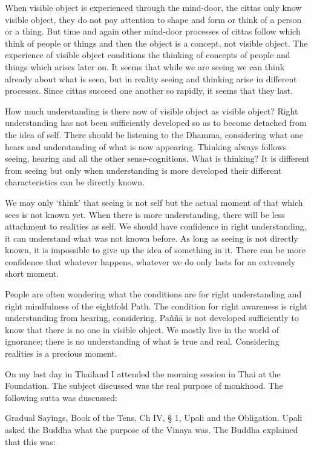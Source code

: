 When visible object is experienced through the mind-door, the cittas only know 
visible object, they do not pay attention to shape and form or think of a person 
or a thing. But time and again other mind-door processes of cittas follow which 
think of people or things and then the object is a concept, not visible object. The 
experience of visible object conditions the thinking of concepts of people and 
things which arises later on. It seems that while we are seeing we can think already about what is seen, but in reality seeing and thinking arise in different 
processes. Since cittas succeed one another so rapidly, it seems that they last. 

How much understanding is there now of visible object as visible object? Right 
understanding has not been sufficiently developed so as to become detached 
from the idea of self. There should be listening to the Dhamma, considering 
what one hears and understanding of what is now appearing. Thinking always 
follows seeing, hearing and all the other sense-cognitions. What is thinking? It 
is different from seeing but only when understanding is more developed their 
different characteristics can be directly known. 

We may only `think' that seeing is not self but the actual moment of that which 
sees is not known yet. When there is more understanding, there will be less attachment to realities as self. We should have confidence in right understanding, 
it can understand what was not known before. As long as seeing is not directly 
known, it is impossible to give up the idea of something in it. There can be 
more confidence that whatever happens, whatever we do only lasts for an extremely short moment. 

People are often wondering what the conditions are for right understanding and 
right mindfulness of the eightfold Path. The condition for right awareness is 
right understanding from hearing, considering. Paññā is not developed sufficiently to know that there is no one in visible object. We mostly live in the 
world of ignorance; there is no understanding of what is true and real. Considering realities is a precious moment. 

On my last day in Thailand I attended the morning session in Thai at the Foundation. The subject discussed was the real purpose of monkhood. The following sutta was duscussed: 

Gradual Sayings, Book of the Tens, Ch IV, § 1, Upali and the Obligation. Upali 
asked the Buddha what the purpose of the Vinaya was. The Buddha explained 
that this was: 


